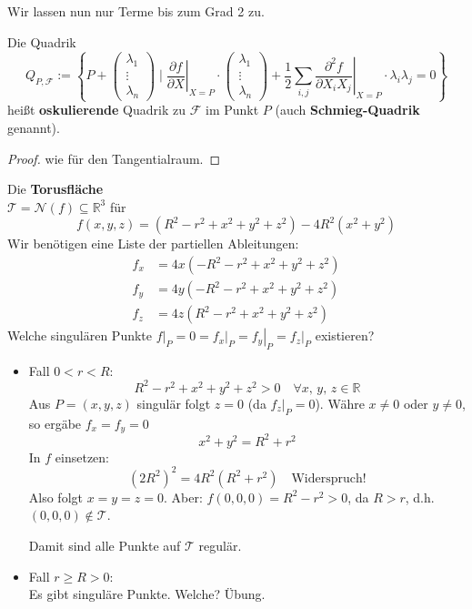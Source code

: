 \documentclass[parskip,a4paper,twoside,DIV15,BCOR12mm]{scrbook}
\begin{document}
Wir lassen nun nur Terme bis zum Grad 2 zu.
\begin{definition}
Die Quadrik
\[
Q_{P,\mathcal{F}}:=\left\{
    P+\begin{pmatrix}\lambda_{1}\\\vdots\\\lambda_{n}\end{pmatrix}\mid
    \left.\frac{\partial f}{\partial X}\right|_{X=P}\cdot
	\begin{pmatrix}\lambda_{1}\\\vdots\\\lambda_{n}\end{pmatrix}
    +\frac{1}{2}\sum_{i,j}{
	\left.\frac{\partial^{2}f}{\partial X_{i}X_{j}}\right|_{X=P}
	\cdot\lambda_{i}\lambda_{j}}=0\right\}
\]
heißt \textbf{oskulierende} Quadrik zu \(\mathcal{F}\) im Punkt \(P\) (auch
\textbf{Schmieg-Quadrik} genannt).
\end{definition}
\begin{comment}
\index{Quadrik!oskulierend}\index{Tangentialraum}\index{Affinität}
\index{Invariante!affine}
Die oskulierende Quadrik ist eine affine Invariante wie der Tangentialraum, d.h.
für jede Affinität \(\vp\) gilt:
\[
Q_{\vp(P),\vp(\mathcal{F})}=\vp\left(Q_{P,\mathcal{F}}\right)
\]
\end{comment}
\begin{proof}
wie für den Tangentialraum.
\end{proof}
\begin{example}
Die \textbf{Torusfläche}\\
\(\mathcal{T}=\mathcal{N}(f)\subseteq\mathbb{R}^{3}\) für
\[
f(x,y,z)=(R^{2}-r^{2}+x^{2}+y^{2}+z^{2})-4R^{2}(x^{2}+y^{2})
\]
Wir benötigen eine Liste der partiellen Ableitungen:
\begin{align*}
f_{x}&=4x(-R^{2}-r^{2}+x^{2}+y^{2}+z^{2})\\
f_{y}&=4y(-R^{2}-r^{2}+x^{2}+y^{2}+z^{2})\\
f_{z}&=4z(R^{2}-r^{2}+x^{2}+y^{2}+z^{2})
\end{align*}
Welche singulären Punkte
\(\left.f\right|_{P}=0=
    \left.f_{x}\right|_{P}=\left.f_{y}\right|_{P}=\left.f_{z}\right|_{P}\)
existieren?
\begin{itemize}
\item{Fall \(0<r<R\):}
\[
R^{2}-r^{2}+x^{2}+y^{2}+z^{2}>0\quad\forall x,\,y,\,z\in\mathbb{R}
\]
Aus \(P=(x,y,z)\) singulär folgt \(z=0\) (da \(\left.f_{z}\right|_{P}=0\)).
Währe \(x\neq0\) oder \(y\neq0\), so ergäbe \(f_{x}=f_{y}=0\)
\[
x^{2}+y^{2}=R^{2}+r^{2}
\]
In \(f\) einsetzen:
\[
\left(2R^{2}\right)^{2}=4R^{2}(R^{2}+r^{2})\quad\text{Widerspruch!}
\]
Also folgt \(x=y=z=0\). Aber: \(f(0,0,0)=R^{2}-r^{2}>0\), da \(R>r\), d.h.
\((0,0,0)\not\in\mathcal{T}\).

Damit sind alle Punkte auf \(\mathcal{T}\) regulär.
\item{Fall \(r\geq R>0\):}\\
Es gibt singuläre Punkte. Welche? \"Ubung. %
\end{itemize}
\end{example}
\end{document}
